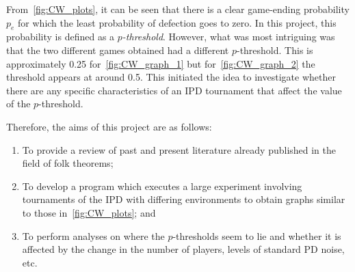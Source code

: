 From~\autoref{fig:CW_plots}, it can be seen that there is a clear game-ending
probability \(p_{e}\) for which the least probability of defection goes to zero.
In this project, this probability is defined as a \textit{\(p\)-threshold}.
However, what was most intriguing was that the two different games obtained had
a different \(p\)-threshold. This is approximately 0.25
for~\autoref{fig:CW_graph_1} but for~\autoref{fig:CW_graph_2} the threshold
appears at around 0.5. This initiated the idea to investigate whether there are
any specific characteristics of an IPD tournament that affect the value of the
\(p\)-threshold.

Therefore, the aims of this project are as follows:
\begin{enumerate}
\item To provide a review of past and present literature already published in
the field of folk theorems;

\item To develop a program which executes a large experiment involving
tournaments of the IPD with differing environments to obtain
graphs similar to those in~\autoref{fig:CW_plots}; and

\item To perform analyses on where the \(p\)-thresholds seem to lie and
whether it is affected by the change in the number of players, levels of
standard PD noise, etc.
\end{enumerate}
